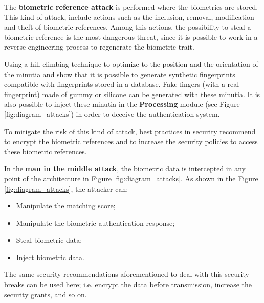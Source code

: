 
The \textbf{biometric reference attack} is performed where the biometrics are stored. This kind of attack, include actions such as the inclusion, removal, modification and theft of biometric references. Among this actions, the possibility to steal a biometric reference is the most dangerous threat, since it is possible to work in a reverse engineering process to regenerate the biometric trait. 

Using a hill climbing technique to optimize to the position and the orientation of the minutia \cite{MartinezDiaz2006} and \cite{hill2001risk} show that it is possible to generate synthetic fingerprints compatible with fingerprints stored in a database. Fake fingers (with a real fingerprint) made of gummy or silicone can be generated with these minutia. It is also possible to inject these minutia in the \textbf{Processing} module (see Figure \ref{fig:diagram_attacks}) in order to deceive the authentication system. 

To mitigate the risk of this kind of attack, best practices in security recommend to encrypt the biometric references and to increase the security policies to access these biometric references. 


In the \textbf{man in the middle attack}, the biometric data is intercepted in any point of the architecture in Figure \ref{fig:diagram_attacks}.  As shown in the Figure \ref{fig:diagram_attacks}, the attacker can:
\begin{itemize}
        \item Manipulate the matching score;
        \item Manipulate the biometric authentication response;
        \item Steal biometric data;
        \item Inject biometric data.
\end{itemize}

The same security recommendations aforementioned to deal with this security breaks can be used here; i.e. encrypt the data before transmission, increase the security grants, and so on. 

